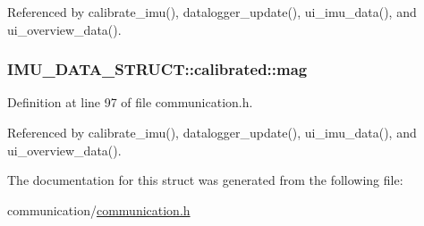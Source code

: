 Referenced by calibrate\-\_\-imu(), datalogger\-\_\-update(), ui\-\_\-imu\-\_\-data(), and ui\-\_\-overview\-\_\-data().

\hypertarget{structIMU__DATA__STRUCT_1_1calibrated_a2fde6c6759e0fda17e272c32096cb9ec}{
\subsubsection[{mag}]{ I\-M\-U\-\_\-\-D\-A\-T\-A\-\_\-\-S\-T\-R\-U\-C\-T\-::calibrated\-::mag}}\label{structIMU__DATA__STRUCT_1_1calibrated_a2fde6c6759e0fda17e272c32096cb9ec}


Definition at line 97 of file communication.\-h.



Referenced by calibrate\-\_\-imu(), datalogger\-\_\-update(), ui\-\_\-imu\-\_\-data(), and ui\-\_\-overview\-\_\-data().



The documentation for this struct was generated from the following file\-:\begin{DoxyCompactItemize}
\item 
communication/\hyperlink{communication_2communication_8h}{communication.\-h}\end{DoxyCompactItemize}
